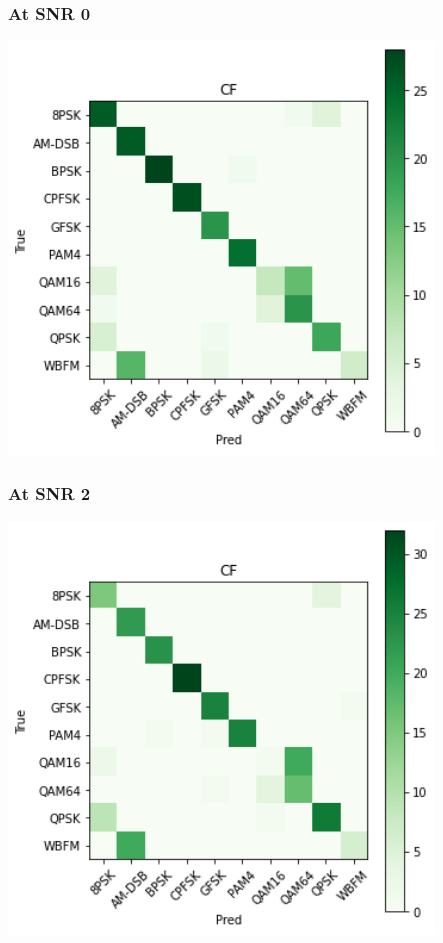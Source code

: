 \documentclass[12pt,a4paper]{article}
\begin{document}
\subsubsection{At SNR 0}
\begin{center}
\includegraphics[width=320pt]{imgs/snrs/snr10.png}
\end{center}
\subsubsection{At SNR 2}
\begin{center}
\includegraphics[width=320pt]{imgs/snrs/snr16.png}
\end{center}
\end{document}
